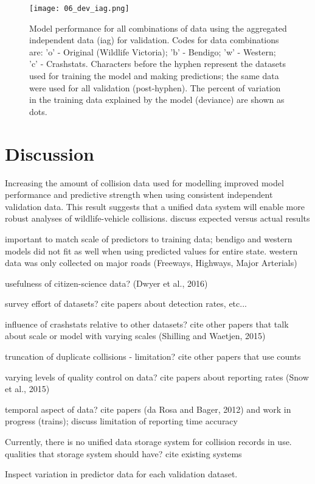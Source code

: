 \begin{figure*}[htp]
  \centering
  \texttt{[image: 06\_dev\_iag.png]}
  \caption[Model discrimination ability for all combinations of training data using the aggregated independent data for validation]{Model performance for all combinations of data using the aggregated independent data (iag) for validation. Codes for data combinations are: 'o' - Original (Wildlife Victoria); 'b' - Bendigo; 'w' - Western; 'c' - Crashstats. Characters before the hyphen represent the datasets used for training the model and making predictions; the same data were used for all validation (post-hyphen). The percent of variation in the training data explained by the model (deviance) are shown as dots.}
  \label{val_calib_dev}
\end{figure*}

\section{Discussion}

Increasing the amount of collision data used for modelling improved model performance and predictive strength when using consistent independent validation data. This result suggests that a unified data system will enable more robust analyses of wildlife-vehicle collisions. discuss expected versus actual results

important to match scale of predictors to training data; bendigo and western models did not fit as well when using predicted values for entire state. western data was only collected on major roads (Freeways, Highways, Major Arterials)

usefulness of citizen-science data? (Dwyer et al., 2016)

survey effort of datasets? cite papers about detection rates, etc...

influence of crashstats relative to other datasets? cite other papers that talk about scale or model with varying scales (Shilling and Waetjen, 2015)

truncation of duplicate collisions - limitation? cite other papers that use counts

varying levels of quality control on data? cite papers about reporting rates (Snow et al., 2015)

temporal aspect of data? cite papers (da Rosa and Bager, 2012) and work in progress (trains); discuss limitation of reporting time accuracy

Currently, there is no unified data storage system for collision records in use. qualities that storage system should have? cite existing systems

Inspect variation in predictor data for each validation dataset.